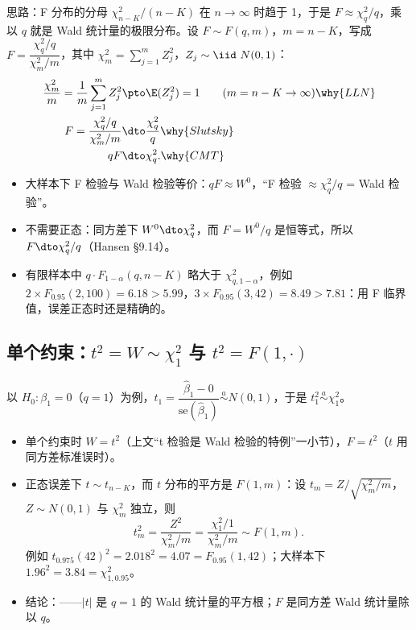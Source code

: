 思路：F 分布的分母 $\chi^2_{n-K}/(n-K)$ 在 $n\to\infty$ 时趋于 1，于是 $F\approx\chi^2_q/q$，乘以 $q$ 就是 Wald 统计量的极限分布。设 $F\sim F(q,m)$，$m=n-K$，写成 $F=\dfrac{\chi^2_q/q}{\chi^2_m/m}$，其中 $\chi^2_m=\sum_{j=1}^mZ_j^2$，$Z_j\sim\iid\ N(0,1)$：
\begin{align*}
\frac{\chi^2_m}{m}=\frac1m\sum_{j=1}^mZ_j^2&\pto\E(Z_j^2)=1\qquad(m=n-K\to\infty) \why{LLN}\\
F=\frac{\chi^2_q/q}{\chi^2_m/m}&\dto\frac{\chi^2_q}{q} \why{Slutsky}\\
qF&\dto\chi^2_q . \why{CMT}
\end{align*}
\begin{itemize}
  \item 大样本下 F 检验与 Wald 检验等价：$qF\approx W^0$，“F 检验 $\approx\chi^2_q/q$ = Wald 检验”。
  \item 不需要正态：同方差下 $W^0\dto\chi^2_q$，而 $F=W^0/q$ 是恒等式，所以 $F\dto\chi^2_q/q$（Hansen §9.14）。
  \item 有限样本中 $q\cdot F_{1-\alpha}(q,n-K)$ 略大于 $\chi^2_{q,1-\alpha}$，例如 $2\times F_{0.95}(2,100)=6.18>5.99$，$3\times F_{0.95}(3,42)=8.49>7.81$：用 F 临界值，误差正态时还是精确的。
\end{itemize}

\subsection{单个约束：\texorpdfstring{$t^2=W\sim\chi^2_1$}{t squared = W ~ chi-square 1} 与 \texorpdfstring{$t^2=F(1,\cdot)$}{t squared = F(1,.)}}

以 $H_0:\beta_1=0$（$q=1$）为例，$t_1=\dfrac{\hat\beta_1-0}{\mathrm{se}(\hat\beta_1)}\overset{a}{\sim}N(0,1)$，于是 $t_1^2\overset{a}{\sim}\chi^2_1$。
\begin{itemize}
  \item 单个约束时 $W=t^2$（上文“t 检验是 Wald 检验的特例”一小节），$F=t^2$（$t$ 用同方差标准误时）。
  \item 正态误差下 $t\sim t_{n-K}$，而 $t$ 分布的平方是 $F(1,m)$：设 $t_m=Z/\sqrt{\chi^2_m/m}$，$Z\sim N(0,1)$ 与 $\chi^2_m$ 独立，则
  \[
  t_m^2=\frac{Z^2}{\chi^2_m/m}=\frac{\chi^2_1/1}{\chi^2_m/m}\sim F(1,m).
  \]
  例如 $t_{0.975}(42)^2=2.018^2=4.07=F_{0.95}(1,42)$；大样本下 $1.96^2=3.84=\chi^2_{1,0.95}$。
  \item 结论：——$|t|$ 是 $q=1$ 的 Wald 统计量的平方根；$F$ 是同方差 Wald 统计量除以 $q$。
\end{itemize}

